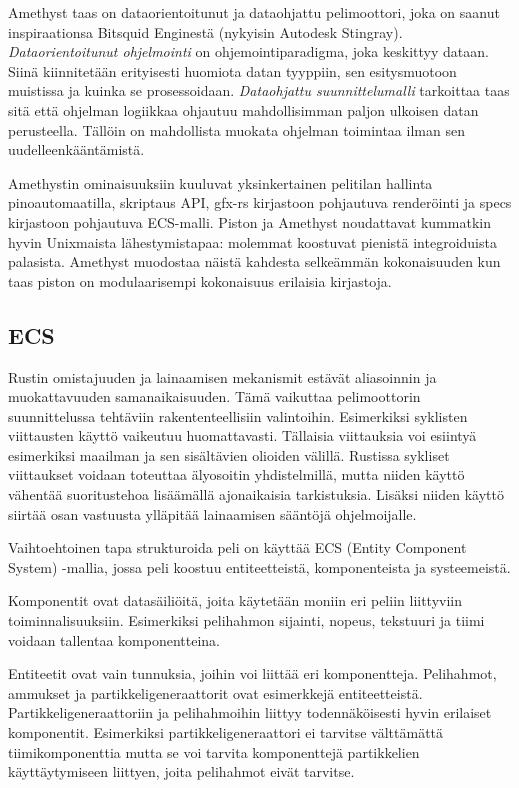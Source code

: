 \documentclass[finnish]{tktltiki2}
\theoremstyle{definition}
\theoremstyle{remark}
\begin{document}
Amethyst\cite{Amethyst} taas on dataorientoitunut ja dataohjattu pelimoottori, joka on saanut inspiraationsa Bitsquid Enginestä (nykyisin Autodesk Stingray)\cite{AmethystReadme}. \textit{Dataorientoitunut ohjelmointi} on ohjemointiparadigma, joka keskittyy dataan. Siinä kiinnitetään erityisesti huomiota datan tyyppiin, sen esitysmuotoon muistissa ja kuinka se prosessoidaan. \textit{Dataohjattu suunnittelumalli} tarkoittaa taas sitä että ohjelman logiikkaa ohjautuu mahdollisimman paljon ulkoisen datan perusteella. Tällöin on mahdollista muokata ohjelman toimintaa ilman sen uudelleenkääntämistä. \cite{AmethystGlossary}

Amethystin ominaisuuksiin kuuluvat yksinkertainen pelitilan hallinta pinoautomaatilla, skriptaus API, gfx-rs kirjastoon pohjautuva renderöinti ja specs kirjastoon pohjautuva ECS-malli. Piston ja Amethyst noudattavat kummatkin hyvin Unixmaista lähestymistapaa: molemmat koostuvat pienistä integroiduista palasista. Amethyst muodostaa näistä kahdesta selkeämmän kokonaisuuden kun taas piston on modulaarisempi kokonaisuus erilaisia kirjastoja.

\subsection{ECS}
Rustin omistajuuden ja lainaamisen mekanismit estävät aliasoinnin ja muokattavuuden samanaikaisuuden. Tämä vaikuttaa pelimoottorin suunnittelussa tehtäviin rakententeellisiin valintoihin. Esimerkiksi syklisten viittausten käyttö vaikeutuu huomattavasti. Tällaisia viittauksia voi esiintyä esimerkiksi maailman ja sen sisältävien olioiden välillä. Rustissa sykliset viittaukset voidaan toteuttaa älyosoitin yhdistelmillä, mutta niiden käyttö vähentää suoritustehoa lisäämällä ajonaikaisia tarkistuksia. Lisäksi niiden käyttö siirtää osan vastuusta ylläpitää lainaamisen sääntöjä ohjelmoijalle.

Vaihtoehtoinen tapa strukturoida peli on käyttää ECS (Entity Component System) -mallia, jossa peli koostuu entiteetteistä, komponenteista ja systeemeistä.

Komponentit ovat datasäiliöitä, joita käytetään moniin eri peliin liittyviin toiminnalisuuksiin. Esimerkiksi pelihahmon sijainti, nopeus, tekstuuri ja tiimi voidaan tallentaa komponentteina.

Entiteetit ovat vain tunnuksia, joihin voi liittää eri komponentteja. Pelihahmot, ammukset ja partikkeligeneraattorit ovat esimerkkejä entiteetteistä. Partikkeligeneraattoriin ja pelihahmoihin liittyy todennäköisesti hyvin erilaiset komponentit. Esimerkiksi partikkeligeneraattori ei tarvitse välttämättä tiimikomponenttia mutta se voi tarvita komponenttejä partikkelien käyttäytymiseen liittyen, joita pelihahmot eivät tarvitse.
\end{document}
